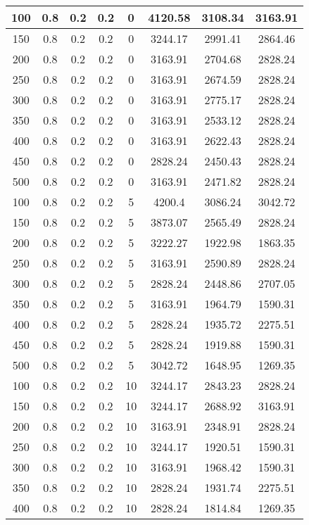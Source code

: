 \documentclass[a4paper, 12pt]{extreport}
\begin{document}
\begin{itemize}
\begin{longtable}{|c|c|c|c|c|c|c|c|}
			100 & 0.8 & 0.2 & 0.2 & 0 & 4120.58 & 3108.34 & 3163.91 \\\hline
			150 & 0.8 & 0.2 & 0.2 & 0 & 3244.17 & 2991.41 & 2864.46 \\\hline
			200 & 0.8 & 0.2 & 0.2 & 0 & 3163.91 & 2704.68 & 2828.24 \\\hline
			250 & 0.8 & 0.2 & 0.2 & 0 & 3163.91 & 2674.59 & 2828.24 \\\hline
			300 & 0.8 & 0.2 & 0.2 & 0 & 3163.91 & 2775.17 & 2828.24 \\\hline
			350 & 0.8 & 0.2 & 0.2 & 0 & 3163.91 & 2533.12 & 2828.24 \\\hline
			400 & 0.8 & 0.2 & 0.2 & 0 & 3163.91 & 2622.43 & 2828.24 \\\hline
			450 & 0.8 & 0.2 & 0.2 & 0 & 2828.24 & 2450.43 & 2828.24 \\\hline
			500 & 0.8 & 0.2 & 0.2 & 0 & 3163.91 & 2471.82 & 2828.24 \\\hline
			100 & 0.8 & 0.2 & 0.2 & 5 & 4200.4 & 3086.24 & 3042.72 \\\hline
			150 & 0.8 & 0.2 & 0.2 & 5 & 3873.07 & 2565.49 & 2828.24 \\\hline
			200 & 0.8 & 0.2 & 0.2 & 5 & 3222.27 & 1922.98 & 1863.35 \\\hline
			250 & 0.8 & 0.2 & 0.2 & 5 & 3163.91 & 2590.89 & 2828.24 \\\hline
			300 & 0.8 & 0.2 & 0.2 & 5 & 2828.24 & 2448.86 & 2707.05 \\\hline
			350 & 0.8 & 0.2 & 0.2 & 5 & 3163.91 & 1964.79 & 1590.31 \\\hline
			400 & 0.8 & 0.2 & 0.2 & 5 & 2828.24 & 1935.72 & 2275.51 \\\hline
			450 & 0.8 & 0.2 & 0.2 & 5 & 2828.24 & 1919.88 & 1590.31 \\\hline
			500 & 0.8 & 0.2 & 0.2 & 5 & 3042.72 & 1648.95 & 1269.35 \\\hline
			100 & 0.8 & 0.2 & 0.2 & 10 & 3244.17 & 2843.23 & 2828.24 \\\hline
			150 & 0.8 & 0.2 & 0.2 & 10 & 3244.17 & 2688.92 & 3163.91 \\\hline
			200 & 0.8 & 0.2 & 0.2 & 10 & 3163.91 & 2348.91 & 2828.24 \\\hline
			250 & 0.8 & 0.2 & 0.2 & 10 & 3244.17 & 1920.51 & 1590.31 \\\hline
			300 & 0.8 & 0.2 & 0.2 & 10 & 3163.91 & 1968.42 & 1590.31 \\\hline
			350 & 0.8 & 0.2 & 0.2 & 10 & 2828.24 & 1931.74 & 2275.51 \\\hline
			400 & 0.8 & 0.2 & 0.2 & 10 & 2828.24 & 1814.84 & 1269.35 \\\hline

\end{longtable}
\end{itemize}
\end{document}
